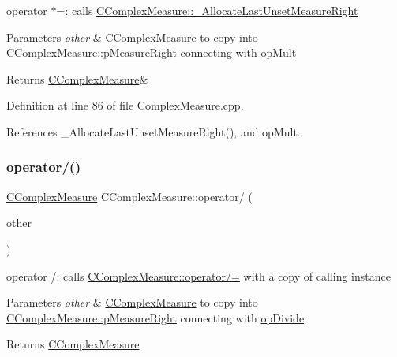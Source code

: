 operator $\ast$=\+: calls \hyperlink{classCComplexMeasure_aee812c93b8b2fe3839e9a38df63cfd53}{C\+Complex\+Measure\+::\+\_\+\+Allocate\+Last\+Unset\+Measure\+Right} 


\begin{DoxyParams}{Parameters}
{\em other} & \hyperlink{classCComplexMeasure}{C\+Complex\+Measure} to copy into \hyperlink{classCComplexMeasure_abbafc4b16676d223ed34860b8ece1b6b}{C\+Complex\+Measure\+::p\+Measure\+Right} connecting with \hyperlink{MeasureOperator_8h_a1431c79e3ad4b4c5bcc9f31f188538f2ad474827f099ae98a2f2c92e1ef548eb2}{op\+Mult} \\
\hline
\end{DoxyParams}
\begin{DoxyReturn}{Returns}
\hyperlink{classCComplexMeasure}{C\+Complex\+Measure}\& 
\end{DoxyReturn}


Definition at line 86 of file Complex\+Measure.\+cpp.



References \+\_\+\+Allocate\+Last\+Unset\+Measure\+Right(), and op\+Mult.

\mbox{\label{classCComplexMeasure_a730c8745ab3d499a20d09f6faa47bdd2}} 
\subsubsection{\texorpdfstring{operator/()}{operator/()}}
{\footnotesize\ttfamily \hyperlink{classCComplexMeasure}{C\+Complex\+Measure} C\+Complex\+Measure\+::operator/ (\begin{DoxyParamCaption}\item[{const \hyperlink{classCComplexMeasure}{C\+Complex\+Measure} \&}]{other }\end{DoxyParamCaption})}



operator /\+: calls \hyperlink{classCComplexMeasure_a68c42a3ea08d1482f4dfdda5e34407f5}{C\+Complex\+Measure\+::operator/=} with a copy of calling instance 


\begin{DoxyParams}{Parameters}
{\em other} & \hyperlink{classCComplexMeasure}{C\+Complex\+Measure} to copy into \hyperlink{classCComplexMeasure_abbafc4b16676d223ed34860b8ece1b6b}{C\+Complex\+Measure\+::p\+Measure\+Right} connecting with \hyperlink{MeasureOperator_8h_a1431c79e3ad4b4c5bcc9f31f188538f2a160251a34f9a9a8ee362dc477d5ba790}{op\+Divide} \\
\hline
\end{DoxyParams}
\begin{DoxyReturn}{Returns}
\hyperlink{classCComplexMeasure}{C\+Complex\+Measure} 
\end{DoxyReturn}


